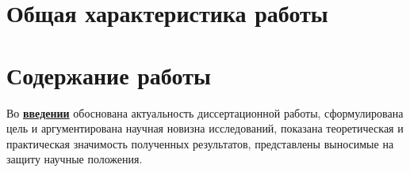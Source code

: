 \section*{Общая характеристика работы}

\newcommand{\actuality}{\pdfbookmark[1]{Актуальность}{actuality}\underline{\textbf{\actualityTXT}}}
\newcommand{\progress}{\pdfbookmark[1]{Разработанность темы}{progress}\underline{\textbf{\progressTXT}}}
\newcommand{\aim}{\pdfbookmark[1]{Цели}{aim}\underline{{\textbf\aimTXT}}}
\newcommand{\tasks}{\pdfbookmark[1]{Задачи}{tasks}\underline{\textbf{\tasksTXT}}}
\newcommand{\aimtasks}{\pdfbookmark[1]{Цели и задачи}{aimtasks}\aimtasksTXT}
\newcommand{\novelty}{\pdfbookmark[1]{Научная новизна}{novelty}\underline{\textbf{\noveltyTXT}}}
\newcommand{\influence}{\pdfbookmark[1]{Практическая значимость}{influence}\underline{\textbf{\influenceTXT}}}
\newcommand{\methods}{\pdfbookmark[1]{Методология и методы исследования}{methods}\underline{\textbf{\methodsTXT}}}
\newcommand{\defpositions}{\pdfbookmark[1]{Положения, выносимые на защиту}{defpositions}\underline{\textbf{\defpositionsTXT}}}
\newcommand{\reliability}{\pdfbookmark[1]{Достоверность}{reliability}\underline{\textbf{\reliabilityTXT}}}
\newcommand{\probation}{\pdfbookmark[1]{Апробация}{probation}\underline{\textbf{\probationTXT}}}
\newcommand{\contribution}{\pdfbookmark[1]{Личный вклад}{contribution}\underline{\textbf{\contributionTXT}}}
\newcommand{\publications}{\pdfbookmark[1]{Публикации}{publications}\underline{\textbf{\publicationsTXT}}}




\section*{Содержание работы}
Во \underline{\textbf{введении}} обоснована актуальность диссертационной работы,
сформулирована цель и аргументирована научная новизна исследований, показана
теоретическая и практическая значимость полученных результатов,
представлены выносимые на защиту научные положения.


